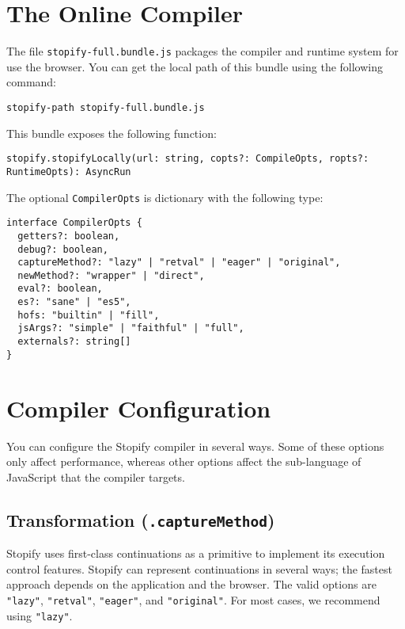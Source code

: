 \documentclass[10pt]{book}
\begin{document}
\section{The Online Compiler}
\lstset{language=console}

The file \lstinline|stopify-full.bundle.js| packages the compiler and runtime
system for use the browser. You can get the local path of this bundle using the
following command:
\lstset{language=console}
\begin{lstlisting}
stopify-path stopify-full.bundle.js
\end{lstlisting}

This bundle exposes the following function:

\lstset{language=js}
\begin{lstlisting}
stopify.stopifyLocally(url: string, copts?: CompileOpts, ropts?: RuntimeOpts): AsyncRun
\end{lstlisting}

The optional \lstinline|CompilerOpts| is dictionary with the following type:

\begin{lstlisting}
interface CompilerOpts {
  getters?: boolean,
  debug?: boolean,
  captureMethod?: "lazy" | "retval" | "eager" | "original",
  newMethod?: "wrapper" | "direct",
  eval?: boolean,
  es?: "sane" | "es5",
  hofs: "builtin" | "fill",
  jsArgs?: "simple" | "faithful" | "full",
  externals?: string[]
}
\end{lstlisting}



\section{Compiler Configuration}

\lstset{language=js}

You can configure the Stopify compiler in several ways. Some of these
options only affect performance, whereas other options affect the
sub-language of JavaScript that the compiler targets.

\subsection{Transformation (\texttt{.captureMethod})\label{transformation}}

Stopify uses first-class continuations as a primitive to implement its
execution control features. Stopify can represent continuations in several
ways; the fastest approach depends on the application and the browser. The
valid options are \lstinline|"lazy"|, \lstinline|"retval"|, \lstinline|"eager"|,
and \lstinline|"original"|. For most cases, we recommend using
\lstinline|"lazy"|.
\end{document}
